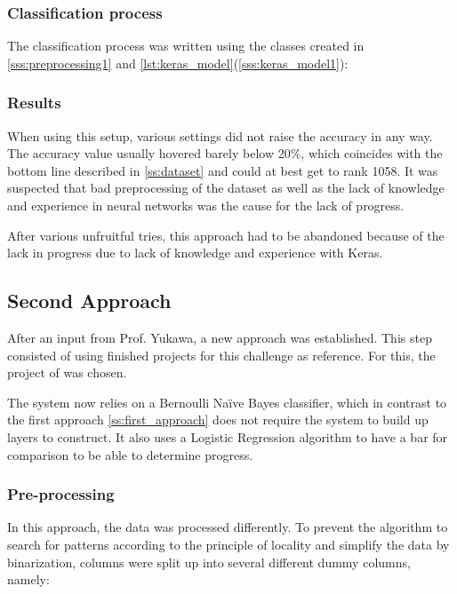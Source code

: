 \documentclass[12pt,a4paper]{scrartcl}
\begin{document}
\subsubsection{Classification process}\label{sss:classification_process1}
The classification process was written using the classes created in \ref{sss:preprocessing1} and \ref{lst:keras_model}(\ref{sss:keras_model1}):



\subsubsection{Results}\label{sss:results1}
When using this setup, various settings did not raise the accuracy in any way. The accuracy value usually hovered barely below 20\%, which coincides with the bottom line described in \ref{ss:dataset} and could at best get to rank 1058. It was suspected that bad preprocessing of the dataset as well as the lack of knowledge and experience in neural networks was the cause for the lack of progress.

After various unfruitful tries, this approach had to be abandoned because of the lack in progress due to lack of knowledge and experience with Keras.

\pagebreak
\subsection{Second Approach}\label{ss:second_approach}
After an input from Prof. Yukawa, a new approach was established. This step consisted of using finished projects for this challenge as reference. For this, the project of \cite{efavdb_sf_crime_prediction} was chosen.

The system now relies on a Bernoulli Naïve Bayes classifier, which in contrast to the first approach \ref{ss:first_approach} does not require the system to build up layers to construct. It also uses a Logistic Regression algorithm to have a bar for comparison to be able to determine progress.

\subsubsection{Pre-processing}\label{sss:preprocessing2}
In this approach, the data was processed differently. To prevent the algorithm to search for patterns according to the principle of locality and simplify the data by binarization, columns were split up into several different dummy columns, namely:
\end{document}
